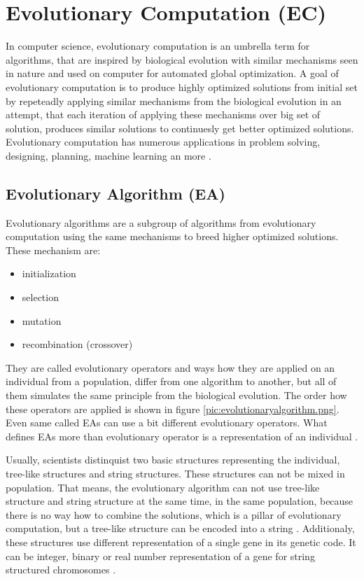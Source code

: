 \chapter{Evolutionary Computation (EC)}\label{chapter2}
In computer science, evolutionary computation is an umbrella term for algorithms, that are inspired by biological evolution with similar mechanisms seen in nature and used on computer for automated global optimization. A goal of evolutionary computation is to produce highly optimized solutions from initial set by repeteadly applying similar mechanisms from the biological evolution in an attempt, that each iteration of applying these mechanisms over big set of solution, produces similar solutions to continuesly get better optimized solutions. Evolutionary computation has numerous applications in problem solving, designing, planning, machine learning an more \cite{handbook-of-evolutionary-computation}.

\section{Evolutionary Algorithm (EA)}
Evolutionary algorithms are a subgroup of algorithms from evolutionary computation using the same mechanisms to breed higher optimized solutions. These mechanism are:
\begin{itemize}
  \item initialization
  \item selection
  \item mutation
  \item recombination (crossover)
\end{itemize}

They are called evolutionary operators \cite{evolutionary-operators} and ways how they are applied on an individual from a population, differ from one algorithm to another, but all of them simulates the same principle from the biological evolution. The order how these operators are applied is shown in figure \ref{pic:evolutionaryalgorithm.png}. Even same called EAs can use a bit different evolutionary operators. What defines EAs more than evolutionary operator is a representation of an individual \cite{evolutionary-algorithms}.

Usually, scientists distinquist two basic structures representing the individual, tree-like structures and string structures. These structures can not be mixed in population. That means, the evolutionary algorithm can not use tree-like structure and string structure at the same time, in the same population, because there is no way how to combine the solutions, which is a pillar of evolutionary computation, but a tree-like structure can be encoded into a string \cite{gene-expression}. Additionaly, these structures use different representation of a single gene in its genetic code. It can be integer, binary or real number representation of a gene for string structured chromosomes \cite{genetic-programming}.


